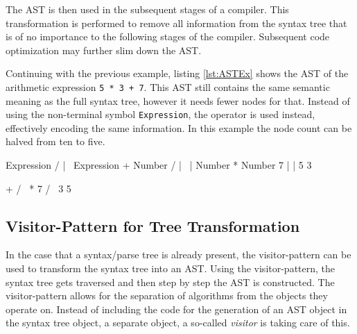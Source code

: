 The AST is then used in the subsequent stages of a compiler. This transformation is performed to remove all information from the syntax tree that is of no importance to the following stages of the compiler. Subsequent code optimization may further slim down the AST. 

Continuing with the previous example, listing \ref{lst:ASTEx} shows the AST of the arithmetic expression \texttt{5 * 3 + 7}. This AST still contains the same semantic meaning as the full syntax tree, however it needs fewer nodes for that. Instead of using the non-terminal symbol \texttt{Expression}, the operator is used instead, effectively encoding the same information. In this example the node count can be halved from ten to five.

\begin{GenericCode}[float,numbers=none,caption=Syntax tree of the arithmetic expression \texttt{5 * 3 + 7}., label=lst:SyntaxTreeEx]
                                   Expression
                                  /     |    \
                            Expression  +    Number
                           /    |    \         |    
                        Number  *  Number      7
                          |          | 
                          5          3   
\end{GenericCode}

\begin{GenericCode}[float,numbers=none,caption=Abstract syntax tree of the arithmetic expression \texttt{5 * 3 + 7}., label=lst:ASTEx]
                                      +
                                    /   \
                                   *     7
                                 /   \
                                3     5
\end{GenericCode}

\subsection{Visitor-Pattern for Tree Transformation}

In the case that a syntax/parse tree is already present, the visitor-pattern can be used to transform the syntax tree into an AST. Using the visitor-pattern, the syntax tree gets traversed and then step by step the AST is constructed. The visitor-pattern allows for the separation of algorithms from the objects they operate on. Instead of including the code for the generation of an AST object in the syntax tree object, a separate object, a so-called \textit{visitor} is taking care of this. 

